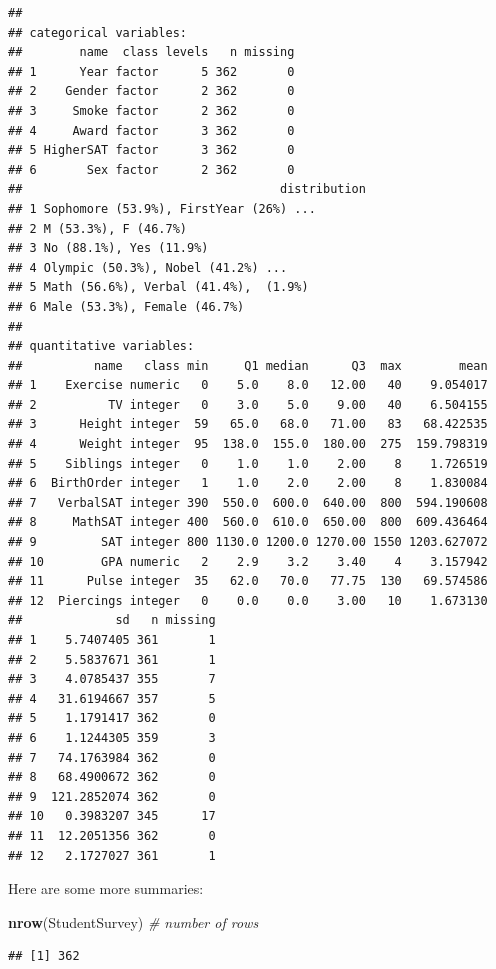 \documentclass[]{book}
\newenvironment{Shaded}{\begin{snugshade}}{\end{snugshade}}
\newcommand{\CommentTok}[1]{\textcolor[rgb]{0.56,0.35,0.01}{\textit{#1}}}
\newcommand{\KeywordTok}[1]{\textcolor[rgb]{0.13,0.29,0.53}{\textbf{#1}}}
\newcommand{\NormalTok}[1]{#1}
\begin{document}
\begin{verbatim}
## 
## categorical variables:  
##        name  class levels   n missing
## 1      Year factor      5 362       0
## 2    Gender factor      2 362       0
## 3     Smoke factor      2 362       0
## 4     Award factor      3 362       0
## 5 HigherSAT factor      3 362       0
## 6       Sex factor      2 362       0
##                                    distribution
## 1 Sophomore (53.9%), FirstYear (26%) ...       
## 2 M (53.3%), F (46.7%)                         
## 3 No (88.1%), Yes (11.9%)                      
## 4 Olympic (50.3%), Nobel (41.2%) ...           
## 5 Math (56.6%), Verbal (41.4%),  (1.9%)        
## 6 Male (53.3%), Female (46.7%)                 
## 
## quantitative variables:  
##          name   class min     Q1 median      Q3  max        mean
## 1    Exercise numeric   0    5.0    8.0   12.00   40    9.054017
## 2          TV integer   0    3.0    5.0    9.00   40    6.504155
## 3      Height integer  59   65.0   68.0   71.00   83   68.422535
## 4      Weight integer  95  138.0  155.0  180.00  275  159.798319
## 5    Siblings integer   0    1.0    1.0    2.00    8    1.726519
## 6  BirthOrder integer   1    1.0    2.0    2.00    8    1.830084
## 7   VerbalSAT integer 390  550.0  600.0  640.00  800  594.190608
## 8     MathSAT integer 400  560.0  610.0  650.00  800  609.436464
## 9         SAT integer 800 1130.0 1200.0 1270.00 1550 1203.627072
## 10        GPA numeric   2    2.9    3.2    3.40    4    3.157942
## 11      Pulse integer  35   62.0   70.0   77.75  130   69.574586
## 12  Piercings integer   0    0.0    0.0    3.00   10    1.673130
##             sd   n missing
## 1    5.7407405 361       1
## 2    5.5837671 361       1
## 3    4.0785437 355       7
## 4   31.6194667 357       5
## 5    1.1791417 362       0
## 6    1.1244305 359       3
## 7   74.1763984 362       0
## 8   68.4900672 362       0
## 9  121.2852074 362       0
## 10   0.3983207 345      17
## 11  12.2051356 362       0
## 12   2.1727027 361       1
\end{verbatim}

Here are some more summaries:

\begin{Shaded}
\begin{Highlighting}[]
\KeywordTok{nrow}\NormalTok{(StudentSurvey) }\CommentTok{# number of rows}
\end{Highlighting}
\end{Shaded}

\begin{verbatim}
## [1] 362
\end{verbatim}
\end{document}
